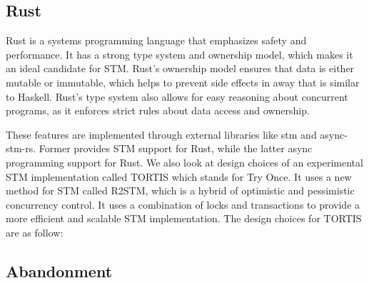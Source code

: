 \subsection{Rust}
Rust is a systems programming language that emphasizes safety and performance. It has a strong type system and ownership model, which makes it an ideal candidate for STM. Rust's ownership model ensures that data is either mutable or immutable, which helps to prevent side effects in away that is similar to Haskell. Rust's type system also allows for easy reasoning about concurrent programs, as it enforces strict rules about data access and ownership.

These features are implemented through external libraries like stm and async-stm-rs. Former provides STM support for Rust, while the latter async programming support for Rust.
We also look at design choices of an experimental STM implementation called TORTIS which stands for Try Once.
It uses a new method for STM called R2STM, which is a hybrid of optimistic and pessimistic concurrency control. It uses a combination of locks and transactions to provide a more efficient and scalable STM implementation. The design choices for TORTIS are as follow:\\


\subsection{Abandonment}

